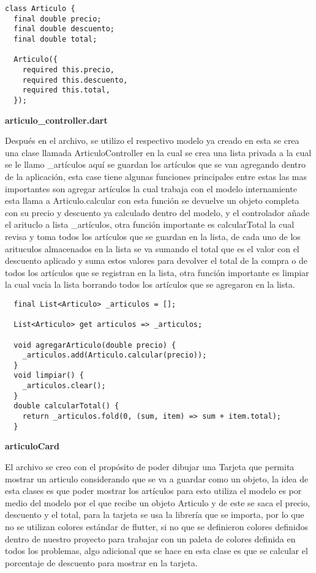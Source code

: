 \begin{center}
\begin{lstlisting}
class Articulo {
  final double precio;
  final double descuento;
  final double total;

  Articulo({
    required this.precio,
    required this.descuento,
    required this.total,
  });
\end{lstlisting}
\end{center}

\textbf{articulo\_controller.dart}

Después en el archivo, se utilizo el respectivo modelo ya creado en esta se crea una clase llamada ArticuloController en la cual se crea una lista privada a la cual se le llamo \_artículos aquí se guardan los artículos que se van agregando dentro de la aplicación, esta case tiene algunas funciones principales entre estas las mas importantes son agregar artículos la cual trabaja con el modelo internamiente esta llama a Articulo.calcular con esta función se devuelve un objeto completa con su precio y descuento ya calculado dentro del modelo, y el controlador añade el arituclo a lista \_artículos, otra función importante es calcularTotal la cual revisa y toma todos los artículos que se guardan en la lista, de cada uno de los arituculos almacenados en la lista se va sumando el total que es el valor con el descuento aplicado y suma estos valores para devolver el total de la compra o de todos los artículos que se registran en la lista, otra función importante es limpiar la cual vacia la lista borrando todos los artículos que se agregaron en la lista.


\begin{center}
\begin{lstlisting}
  final List<Articulo> _articulos = [];
  
  List<Articulo> get articulos => _articulos;
  
  void agregarArticulo(double precio) {
    _articulos.add(Articulo.calcular(precio));
  }
  void limpiar() {
    _articulos.clear();
  }
  double calcularTotal() {
    return _articulos.fold(0, (sum, item) => sum + item.total);
  }
\end{lstlisting}
\end{center}

\textbf{articuloCard}

El archivo se creo con el propósito de poder dibujar una Tarjeta que permita mostrar un articulo considerando que se va a guardar como un objeto, la idea de esta clases es que poder mostrar los artículos para esto utiliza el modelo es por medio del modelo por el que recibe un objeto Articulo y de este se saca el precio, descuento y el total, para la tarjeta se usa la librería que se importa, por lo que no se utilizan colores estándar de flutter, si no que se definieron colores definidos dentro de nuestro proyecto para trabajar con un paleta de colores definida en todos los problemas, algo adicional que se hace en esta clase es que se calcular el porcentaje de descuento para mostrar en la tarjeta.

